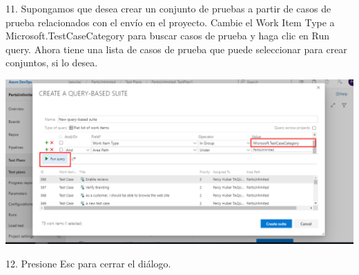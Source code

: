\documentclass[12pt,letterpaper]{article}
\begin{document}
11. Supongamos que desea crear un conjunto de pruebas a partir de casos de prueba relacionados con el envío en el proyecto. Cambie el Work Item Type a Microsoft.TestCaseCategory para buscar casos de prueba y haga clic en Run query. Ahora tiene una lista de casos de prueba que puede seleccionar para crear conjuntos, si lo desea.

\begin{center}
		\includegraphics[width=15cm]{./Imagenes/38} 
\end{center}

12. Presione Esc para cerrar el diálogo.
\end{document}
